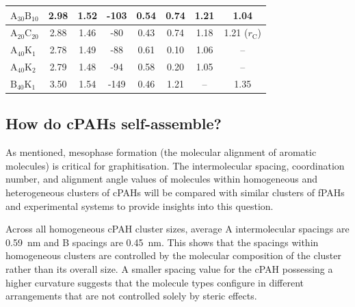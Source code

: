 \begin{table}[ht]
\begin{tabular}{lccccccc}
$\text{A}_{\text{30}}\text{B}_{\text{10}}$ & 2.98 & 1.52 & -103 & 0.54 & 0.74 & 1.21 & 1.04 \\ \hline
$\text{A}_{\text{20}}\text{C}_{\text{20}}$ & 2.88 & 1.46 & -80 & 0.43 & 0.74 & 1.18 & 1.21 ($r_{\text{C}}$) \\ \hline
$\text{A}_{\text{40}}\text{K}_{\text{1}}$ & 2.78 & 1.49 & -88 & 0.61 & 0.10 & 1.06 & -- \\
$\text{A}_{\text{40}}\text{K}_{\text{2}}$ & 2.79 & 1.48 & -94 & 0.58 & 0.20 & 1.05 & -- \\ 
$\text{B}_{\text{40}}\text{K}_{\text{1}}$ & 3.50 & 1.54 & -149 & 0.46 & 1.21 & -- & 1.35 \\ 
\end{tabular}
\end{table}
%

\subsection{How do cPAHs self-assemble?} 
As mentioned, mesophase formation (the molecular alignment of aromatic molecules) is critical for graphitisation. The intermolecular spacing, coordination number, and alignment angle values of molecules within homogeneous and heterogeneous clusters of cPAHs will be compared with similar clusters of fPAHs and experimental systems to provide insights into this question.

Across all homogeneous cPAH cluster sizes, average A intermolecular spacings are 0.59~nm and B spacings are 0.45~nm.  This shows that the spacings within homogeneous clusters are controlled by the molecular composition of the cluster rather than its overall size.  A smaller spacing value for the cPAH possessing a higher curvature suggests that the molecule types configure in different arrangements that are not controlled solely by steric effects. 

